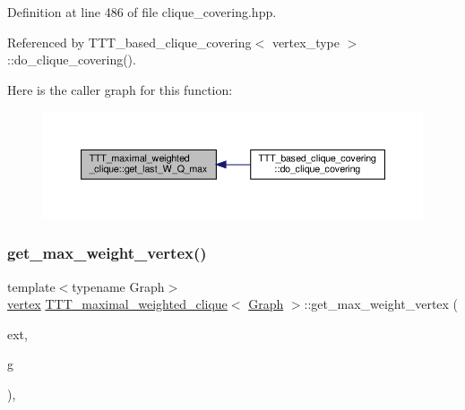 Definition at line 486 of file clique\+\_\+covering.\+hpp.



Referenced by T\+T\+T\+\_\+based\+\_\+clique\+\_\+covering$<$ vertex\+\_\+type $>$\+::do\+\_\+clique\+\_\+covering().

Here is the caller graph for this function\+:
\nopagebreak
\begin{figure}[H]
\begin{center}
\leavevmode
\includegraphics[width=350pt]{df/d1e/classTTT__maximal__weighted__clique_a3ac9a4a7d8f4fd5adfe0708ec06a68c3_icgraph}
\end{center}
\end{figure}
\mbox{\label{classTTT__maximal__weighted__clique_adadf04df62faabaa24645aaf3516c31a}} 
\subsubsection{\texorpdfstring{get\+\_\+max\+\_\+weight\+\_\+vertex()}{get\_max\_weight\_vertex()}}
{\footnotesize\ttfamily template$<$typename Graph$>$ \\
\hyperlink{classTTT__maximal__weighted__clique_ac6a30ba8fb726c9c83eafe9dc451a799}{vertex} \hyperlink{classTTT__maximal__weighted__clique}{T\+T\+T\+\_\+maximal\+\_\+weighted\+\_\+clique}$<$ \hyperlink{structGraph}{Graph} $>$\+::get\+\_\+max\+\_\+weight\+\_\+vertex (\begin{DoxyParamCaption}\item[{\hyperlink{classCustomUnorderedSet}{Custom\+Unordered\+Set}$<$ \hyperlink{classTTT__maximal__weighted__clique_ac6a30ba8fb726c9c83eafe9dc451a799}{vertex} $>$ \&}]{ext,  }\item[{const \hyperlink{structGraph}{Graph} \&}]{g }\end{DoxyParamCaption})\hspace{0.3cm}{\ttfamily [inline]}, {\ttfamily [private]}}



